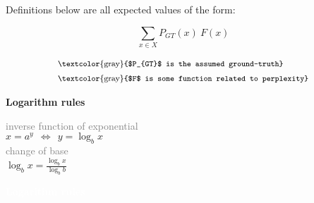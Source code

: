 \documentclass[a4paper,fleqn,reqno,12pt,landscape]{article}
\newcommand{\mygray}[1]{\textcolor{gray}{#1}}
\newcommand{\myremark}[1]{{\footnotesize\mygray{#1}}}
\begin{document}
\begin{paracol}{2}
\begin{minipage}[t]{0.5\linewidth}
    Definitions below are all expected values of the form: \\
    \begin{minipage}[t]{0.3\linewidth}
      \strut\vspace*{-\baselineskip}\newline
      \begin{equation*}
        \sum_{x \in X} P_{GT}(x) \ F(x)
      \end{equation*}
    \end{minipage}
    \hspace*{-0.5cm}
    \begin{minipage}[t]{0.5\linewidth}
      \strut\vspace*{-\baselineskip}\newline
      \vspace*{-0.75cm}
      \begin{align*}
        & \text{\myremark{$P_{GT}$ is the assumed ground-truth}}\\
        & \text{\myremark{$F$ is some function related to perplexity}}
      \end{align*}
    \end{minipage}
  \end{minipage}
  \hfill
  \begin{minipage}[t]{0.23\linewidth}
    \strut\vspace*{-\baselineskip}\newline
    \textbf{Logarithm rules}

    \medskip

    \myremark{inverse function of exponential}\\
    \hspace*{0.1em }$x = a^{y} \ \  \Leftrightarrow  \ \  y = \log_{b} x$
    \medskip
    \\
    \myremark{change of base}\\
    \medskip
    $\log_{b} x = \frac{\log_{b} x}{\log_{b} b}$
  \end{minipage}
  \hfill
  \begin{minipage}[t]{0.2\linewidth}
    \strut\vspace*{-\baselineskip}\newline
    {\textcolor{white}{\textbf{Logarithm rules}}}

    \medskip


\end{minipage}
\end{paracol}
\end{document}
